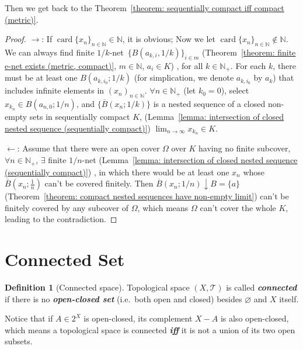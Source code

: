 \documentclass[openany]{book}
\newcommand*{\indexbf}[1]{\emph{\textbf{#1}}\index{#1}} %
\theoremstyle{plain}
\theoremstyle{definition}
\newtheorem{definition}{Definition}[section] %
\newcommand{\emphbf}[1]{\emph{\textbf{#1}}}
\DeclareMathOperator{\card}{card}
\begin{document}
Then we get back to the Theorem~\ref{theorem: sequentially compact iff compact (metric)}. 
\begin{proof}

	$\to$: 
	If $\card \{x_n\}_{n \in \mathbb N} \in \mathbb N$, it is obvious; 
	Now we let $\card \{x_n\}_{n \in \mathbb N} \notin \mathbb N$. 
	We can always find finite $1/k$-net~$\{B(a_{k, i}, 1/k)\}_{i \in m}$
		(Theorem~\ref{theorem: finite e-net exists (metric, compact)}, 
			$m \in \mathbb N$, $a_i \in K$)%
	, for all $k \in \mathbb N_+$. 
	For each $k$, there must be at least one $B(a_{k, i_0}; 1/k)$
		(for simplication, we denote $a_{k, i_0}$ by $a_k$)
	that includes infinite elements in $(x_n)_{n \in \mathbb N}$. 
	$\forall n \in \mathbb N_+$
		(let $k_0 = 0$), 
	select $x_{k_n} \in B(a_{n, 0}; 1/n)$, and $\{\overline B(x_n; 1/k)\}$ is a nested sequence of a closed non-empty sets in sequentially compact $K$,
		(Lemma~\ref{lemma: intersection of closed nested sequence (sequentially compact)})
	$\lim_{n\to \infty} x_{k_n} \in K$.
	
	$\gets$: 
	Assume that there were an open cover $\varOmega$ over $K$ having no finite subcover, $\forall n \in \mathbb N_+$, $\exists$ finite $1/n$-net 
		(Lemma~\ref{lemma: intersection of closed nested sequence (sequentially compact)})%
	, in which there would be at least one $x_n$ whose $\overline B(x_n;\frac{1}{n})$ can't be covered finitely. 
	Then $\overline B(x_n; 1/n) \downarrow B = \{a\}$ 
		(Theorem~\ref{theorem: compact nested sequences have non-empty limit})
	can't be finitely covered by any subcover of $\varOmega$, 
	which means $\varOmega$ can't cover the whole $K$, leading to the contradiction.
\end{proof}

\section{Connected Set}

\begin{definition}[Connected space]\label{definition: connected space}
	Topological space $(X, \mathscr T)$ is called \indexbf{connected}%
	if there is no \indexbf{open-closed set} (i.e.\ both open and closed) besides $\varnothing$ and $X$ itself. 
\end{definition}

Notice that if $A \in 2^X$ is open-closed, its complement $X - A$ is also open-closed, which means a topological space is connected \emphbf{iff} it is not a union of its two open subsets. 
\end{document}

